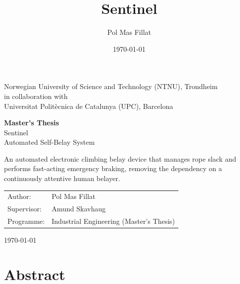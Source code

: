 \documentclass[british]{ntnuthesis}
\title{Sentinel}
\author{Pol Mas Fillat}
\date{\today}
\begin{document}
\begin{titlepage}
    \begin{center}
        \vspace*{1cm}

        {\large Norwegian University of Science and Technology (NTNU), Trondheim}\\[0.2cm]
        {\normalsize in collaboration with}\\[0.2cm]
        {\large Universitat Polit\`ecnica de Catalunya (UPC), Barcelona}

        \vspace{2.5cm}

        {\Huge \bfseries Master's Thesis}\\[0.6cm]
        {\LARGE Sentinel}\\[0.3cm]
        {\Large Automated Self-Belay System}

        \vspace{1cm}

        {\normalsize An automated electronic climbing belay device that
        manages rope slack and performs fast-acting emergency braking,
        removing the dependency on a continuously attentive human belayer.}

        \vfill

        \begin{tabular}{ll}
            Author:      & Pol Mas Fillat \\[0.2cm]
            Supervisor:  & Amund Skavhaug \\[0.2cm]
            Programme:   & Industrial Engineering (Master's Thesis) \\
        \end{tabular}

        \vspace{1.5cm}

        {\large \today}
    \end{center}
\end{titlepage}

\chapter*{Abstract}
\end{document}
